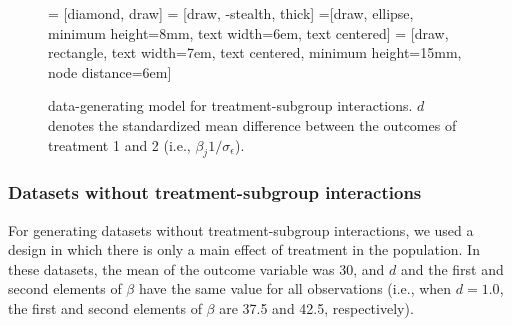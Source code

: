 \documentclass[nobf,doc]{apa}
\begin{document}
\begin{figure}[!h]
     = [diamond, draw]
     = [draw, -stealth, thick]
    =[draw, ellipse, minimum height=8mm, text width=6em, text centered]
    = [draw, rectangle, text width=7em, text centered, minimum height=15mm, node distance=6em]
	\caption{data-generating model for treatment-subgroup interactions. $d$ denotes the standardized mean difference between the outcomes of treatment 1 and 2 (i.e., $\beta_j1 / \sigma_{\epsilon}$).}
	\label{fig:modelC}
\end{figure}


\subsubsection{Datasets without treatment-subgroup interactions}
For generating datasets without treatment-subgroup interactions, we used a design in which there is only a main effect of treatment in the population. In these datasets, the mean of the outcome variable was 30, and $d$ and the first and second elements of $\beta$ have the same value for all observations (i.e., when $d = 1.0$, the first and second elements of $\beta$ are 37.5 and 42.5, respectively). 
\end{document}

